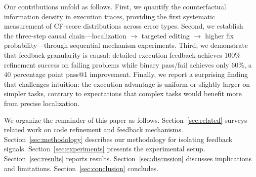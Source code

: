 Our contributions unfold as follows. First, we quantify the counterfactual information density in execution traces, providing the first systematic measurement of CF-score distributions across error types. Second, we establish the three-step causal chain---localization $\rightarrow$ targeted editing $\rightarrow$ higher fix probability---through sequential mechanism experiments. Third, we demonstrate that feedback granularity is causal: detailed execution feedback achieves 100\% refinement success on failing problems while binary pass/fail achieves only 60\%, a 40 percentage point pass@1 improvement. Finally, we report a surprising finding that challenges intuition: the execution advantage is uniform or slightly larger on simpler tasks, contrary to expectations that complex tasks would benefit more from precise localization.

We organize the remainder of this paper as follows. Section~\ref{sec:related} surveys related work on code refinement and feedback mechanisms. Section~\ref{sec:methodology} describes our methodology for isolating feedback signals. Section~\ref{sec:experiments} presents the experimental setup. Section~\ref{sec:results} reports results. Section~\ref{sec:discussion} discusses implications and limitations. Section~\ref{sec:conclusion} concludes.
